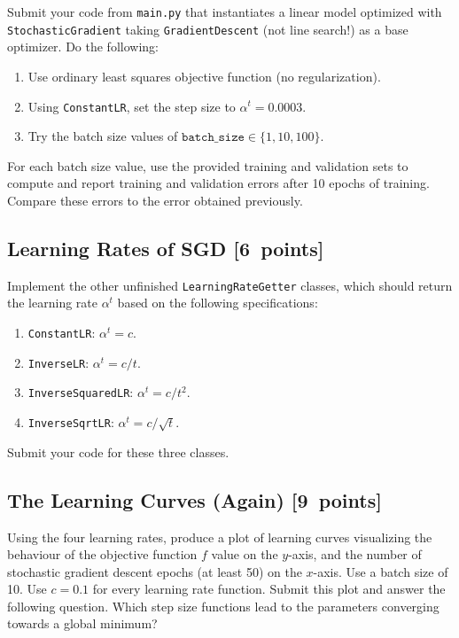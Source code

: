 \documentclass{article}
\newcommand{\blu}[1]{{\textcolor{blu}{#1}}}
\let\ask\blu
\newcommand\pts[1]{\textcolor{pointscolour}{[#1~points]}}
\begin{document}
\ask{Submit your code} from \texttt{main.py} that instantiates a linear model optimized with \texttt{StochasticGradient} taking \texttt{GradientDescent} (not line search!) as a base optimizer. Do the following:
\begin{enumerate}
		\item Use ordinary least squares objective function (no regularization).
		\item Using \texttt{ConstantLR}, set the step size to $\alpha^t = 0.0003$.
		\item Try the batch size values of $\texttt{batch\_size} \in \{1, 10, 100\}$.
\end{enumerate}
\ask{For each batch size value, use the provided training and validation sets to compute and report training and validation errors after 10 epochs of training. Compare these errors to the error obtained previously.}



\subsection{Learning Rates of SGD \pts{6}}

Implement the other unfinished \texttt{LearningRateGetter} classes, which should return the learning rate $\alpha^t$ based on the following
specifications:
\begin{enumerate}
	\item \texttt{ConstantLR}: $\alpha^t = c$.
	\item \texttt{InverseLR}: $\alpha^t = c/t$.
	\item \texttt{InverseSquaredLR}: $\alpha^t = c/t^2$.
	\item \texttt{InverseSqrtLR}: $\alpha^t = c/\sqrt{t}$.
\end{enumerate}
\ask{Submit your code for these three classes.}




\subsection{The Learning Curves (Again) \pts{9}}

Using the four learning rates, produce a plot of learning curves visualizing the behaviour of the objective function $f$ value on the $y$-axis, and the number of stochastic gradient descent epochs (at least 50) on the $x$-axis. Use a batch size of 10. Use $c = 0.1$ for every learning rate function. \blu{Submit this plot and answer the following question. Which step size functions lead to the parameters converging towards a global minimum?}
\end{document}

